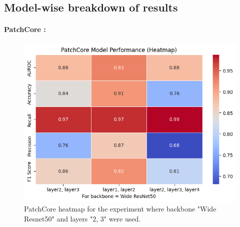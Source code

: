 \subsection{Model-wise breakdown of results}

\paragraph*{PatchCore : }

\begin{figure}[H]
    \centering
    \includegraphics[width=1\linewidth]{Rohit_Master_Thesis//Images/patchcore heatmap.png}
    \caption{PatchCore heatmap for the experiment where backbone "Wide Resnet50" and layers "2, 3" were used.}
    \label{fig:patchcore heatmap}
\end{figure}

